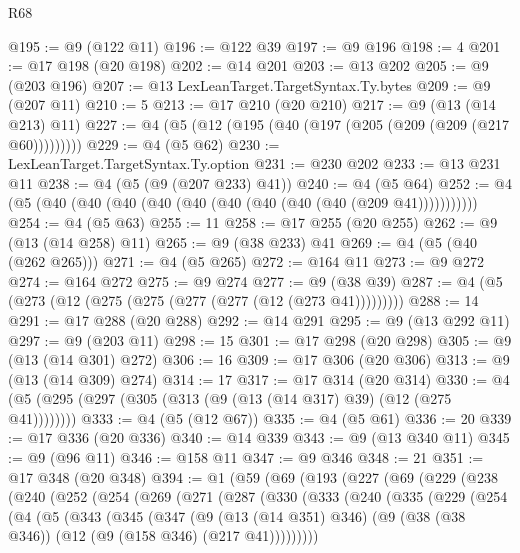 \begin{lexlean}{R68}
\begin{coremodule}
@195 := @9 (@122 @11)
@196 := @122 @39
@197 := @9 @196
@198 := 4
@201 := @17 @198 (@20 @198)
@202 := @14 @201
@203 := @13 @202
@205 := @9 (@203 @196)
@207 := @13 LexLeanTarget.TargetSyntax.Ty.bytes
@209 := @9 (@207 @11)
@210 := 5
@213 := @17 @210 (@20 @210)
@217 := @9 (@13 (@14 @213) @11)
@227 := @4 (@5 (@12 (@195 (@40 (@197 (@205 (@209 (@209 (@217 @60)))))))))
@229 := @4 (@5 @62)
@230 := LexLeanTarget.TargetSyntax.Ty.option
@231 := @230 @202
@233 := @13 @231 @11
@238 := @4 (@5 (@9 (@207 @233) @41))
@240 := @4 (@5 @64)
@252 := @4 (@5 (@40 (@40 (@40 (@40 (@40 (@40 (@40 (@40 (@40 (@209 @41)))))))))))
@254 := @4 (@5 @63)
@255 := 11
@258 := @17 @255 (@20 @255)
@262 := @9 (@13 (@14 @258) @11)
@265 := @9 (@38 @233) @41
@269 := @4 (@5 (@40 (@262 @265)))
@271 := @4 (@5 @265)
@272 := @164 @11
@273 := @9 @272
@274 := @164 @272
@275 := @9 @274
@277 := @9 (@38 @39)
@287 := @4 (@5 (@273 (@12 (@275 (@275 (@277 (@277 (@12 (@273 @41)))))))))
@288 := 14
@291 := @17 @288 (@20 @288)
@292 := @14 @291
@295 := @9 (@13 @292 @11)
@297 := @9 (@203 @11)
@298 := 15
@301 := @17 @298 (@20 @298)
@305 := @9 (@13 (@14 @301) @272)
@306 := 16
@309 := @17 @306 (@20 @306)
@313 := @9 (@13 (@14 @309) @274)
@314 := 17
@317 := @17 @314 (@20 @314)
@330 := @4 (@5 (@295 (@297 (@305 (@313 (@9 (@13 (@14 @317) @39) (@12 (@275 @41))))))))
@333 := @4 (@5 (@12 @67))
@335 := @4 (@5 @61)
@336 := 20
@339 := @17 @336 (@20 @336)
@340 := @14 @339
@343 := @9 (@13 @340 @11)
@345 := @9 (@96 @11)
@346 := @158 @11
@347 := @9 @346
@348 := 21
@351 := @17 @348 (@20 @348)
@394 := @1
    (@59
      (@69
        (@193
          (@227
            (@69
              (@229
                (@238
                  (@240
                    (@252
                      (@254
                        (@269
                          (@271
                            (@287
                              (@330
                                (@333
                                  (@240
                                    (@335
                                      (@229
                                        (@254
                                          (@4
                                            (@5
                                              (@343
                                                (@345
                                                  (@347
                                                    (@9
                                                      (@13 (@14 @351) @346)
                                                      (@9
                                                        (@38 (@38 @346))
                                                        (@12 (@9 (@158 @346) (@217 @41)))))))))

\end{coremodule}
\end{lexlean}
